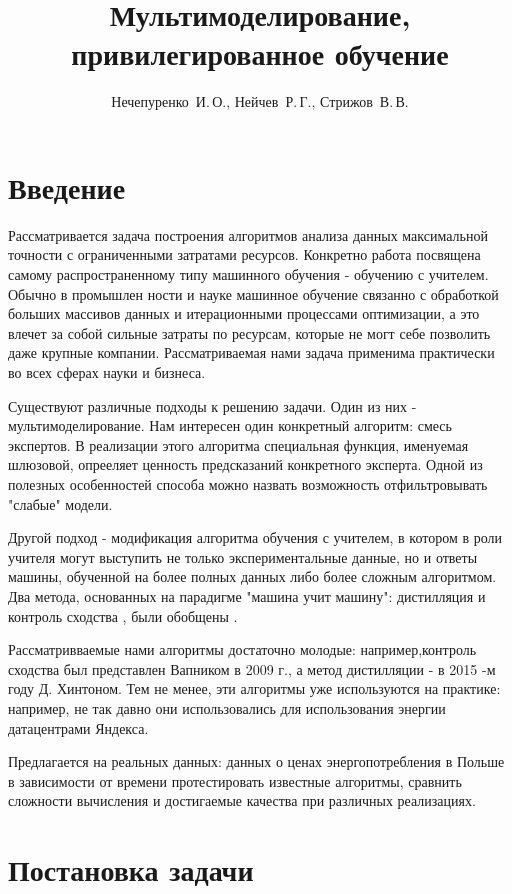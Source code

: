 \documentclass[12pt,twoside]{article}
\title
    [Образец оформления статьи для публикации] %
    {Мультимоделирование, привилегированное обучение}
\author
    [Нечепуренко~И.\,О.] %
    {Нечепуренко~И.\,О., Нейчев~Р.\,Г., Стрижов~В.\,В.} %
    [Нечепуренко~И.\,О.$^1$, Нейчев~Р.\,Г.$^2$, Стрижов~В.\,В.$^2$] %
\begin{document}
\maketitle
\section{Введение}

Рассматривается задача построения алгоритмов анализа данных максимальной точности с ограниченными затратами ресурсов. Конкретно работа посвящена самому распространенному типу машинного обучения - обучению с учителем. Обычно в промышлен ности и науке машинное обучение связанно с обработкой больших массивов данных и итерационными процессами оптимизации, а это влечет за собой сильные затраты по ресурсам, которые не могт себе позволить даже крупные компании. Рассматриваемая нами задача применима практически во всех сферах науки и бизнеса.

Существуют различные подходы к решению задачи. Один из них - мультимоделирование. Нам интересен один конкретный \cite{a}  алгоритм: смесь экспертов. В реализации этого алгоритма специальная функция, именуемая шлюзовой, опрееляет ценность предсказаний конкретного эксперта. Одной из полезных особенностей способа можно назвать возможность отфильтровывать "слабые" модели. 

Другой подход - модификация алгоритма обучения с учителем, в котором в роли учителя могут выступить не только экспериментальные данные, но и ответы машины, обученной на более полных данных либо более сложным алгоритмом.
Два метода, основанных на парадигме "машина учит машину":  дистилляция \cite{b}  и контроль сходства \cite{c} , были обобщены \cite{d} .

Рассматривваемые нами алгоритмы достаточно молодые: например,контроль сходства был представлен Вапником в 2009 г., а метод дистилляции - в 2015 -м году Д. Хинтоном.  Тем не менее, эти алгоритмы уже используются на практике: например, не так давно они использовались для использования энергии датацентрами Яндекса. 

Предлагается на реальных данных: данных о ценах энергопотребления в Польше в зависимости от времени протестировать известные алгоритмы, сравнить сложности вычисления и достигаемые качества при различных  реализациях. 

\section{Постановка задачи}
\end{document}
